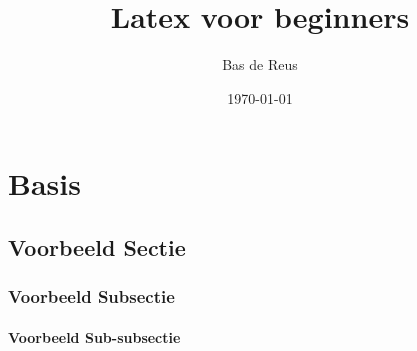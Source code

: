 \documentclass[a4paper]{book}
\begin{document}
\title{Latex voor beginners}
\author{Bas de Reus}
\date{\today}
\maketitle
\tableofcontents

\chapter{Basis}

\blindtext
\blindtext

\section{Voorbeeld Sectie}

\blindtext

\subsection{Voorbeeld Subsectie}

\blindtext

\subsubsection{Voorbeeld Sub-subsectie}

\blindtext
\end{document}

